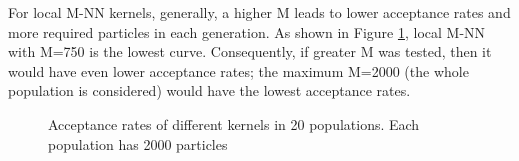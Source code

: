 For local M-NN kernels, generally, a higher M leads to lower acceptance rates and more required particles in each generation. As shown in Figure \ref{fig:acceptance1}, local M-NN with M=750 is the lowest curve. Consequently, if greater M was tested, then it would have even lower acceptance rates; the maximum M=2000 (the whole population is considered) would have the lowest acceptance rates.

\begin{figure}
    \begin{center}
    \end{center}

    \caption[Total required samples of different kernels]%
    {Total required samples of different kernels after 20 populations (2000 particles in each population). Different color represents different generations (bottom to top: population 1 to population 20)}
    \label{fig:kernel1}

    \vspace*{\floatsep}

    \begin{center}
    \end{center}

    \caption[Acceptance rates of different kernels]%
    {Acceptance rates of different kernels in 20 populations. Each population has 2000 particles}
    \label{fig:acceptance1}

\end{figure}


